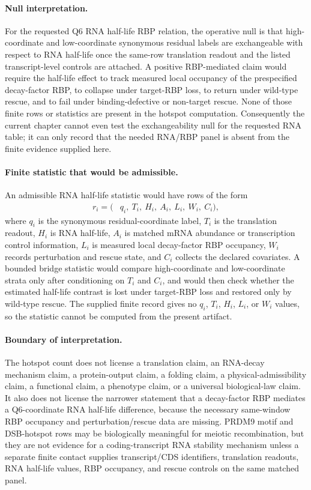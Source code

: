 \paragraph{Null interpretation.}
For the requested Q6 RNA half-life RBP relation, the operative null is that high-coordinate and low-coordinate synonymous residual labels are exchangeable with respect to RNA half-life once the same-row translation readout and the listed transcript-level controls are attached. A positive RBP-mediated claim would require the half-life effect to track measured local occupancy of the prespecified decay-factor RBP, to collapse under target-RBP loss, to return under wild-type rescue, and to fail under binding-defective or non-target rescue. None of those finite rows or statistics are present in the hotspot computation. Consequently the current chapter cannot even test the exchangeability null for the requested RNA table; it can only record that the needed RNA/RBP panel is absent from the finite evidence supplied here.

\paragraph{Finite statistic that would be admissible.}
An admissible RNA half-life statistic would have rows of the form
$$
\begin{aligned}
r_i = (&q_i,\ T_i,\ H_i,\ A_i,\ L_i,\ W_i,\ C_i),
\end{aligned}
$$
where $q_i$ is the synonymous residual-coordinate label, $T_i$ is the translation readout, $H_i$ is RNA half-life, $A_i$ is matched mRNA abundance or transcription control information, $L_i$ is measured local decay-factor RBP occupancy, $W_i$ records perturbation and rescue state, and $C_i$ collects the declared covariates. A bounded bridge statistic would compare high-coordinate and low-coordinate strata only after conditioning on $T_i$ and $C_i$, and would then check whether the estimated half-life contrast is lost under target-RBP loss and restored only by wild-type rescue. The supplied finite record gives no $q_i$, $T_i$, $H_i$, $L_i$, or $W_i$ values, so the statistic cannot be computed from the present artifact.

\paragraph{Boundary of interpretation.}
The hotspot count does not license a translation claim, an RNA-decay mechanism claim, a protein-output claim, a folding claim, a physical-admissibility claim, a functional claim, a phenotype claim, or a universal biological-law claim. It also does not license the narrower statement that a decay-factor RBP mediates a Q6-coordinate RNA half-life difference, because the necessary same-window RBP occupancy and perturbation/rescue data are missing. PRDM9 motif and DSB-hotspot rows may be biologically meaningful for meiotic recombination, but they are not evidence for a coding-transcript RNA stability mechanism unless a separate finite contact supplies transcript/CDS identifiers, translation readouts, RNA half-life values, RBP occupancy, and rescue controls on the same matched panel.

